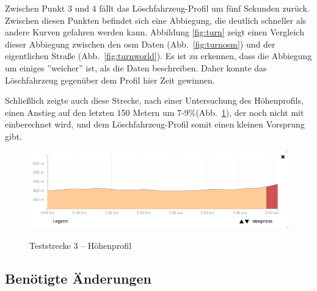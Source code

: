 Zwischen Punkt 3 und 4 fällt das Löschfahrzeug-Profil um fünf Sekunden zurück.
Zwischen diesen Punkten befindet sich eine Abbiegung, die deutlich schneller als andere Kurven gefahren werden kann.
Abbildung \ref{fig:turn} zeigt einen Vergleich dieser Abbiegung zwischen den \gls{osm} Daten (Abb.~\ref{fig:turnosm}) und der eigentlichen Straße (Abb.~\ref{fig:turnworld}).
Es ist zu erkennen, dass die Abbiegung um einiges ''weicher'' ist, als die Daten beschreiben.
Daher konnte das Löschfahrzeug gegenüber dem Profil hier Zeit gewinnen.

Schließlich zeigte auch diese Strecke, nach einer Untersuchung des Höhenprofils, einen Anstieg auf den letzten 150 Metern um 7-9$\%$(Abb.~\ref{fig:profile2}), der noch nicht mit einberechnet wird, und dem Löschfahrzeug-Profil somit einen kleinen Vorsprung gibt.

\begin{figure}[htb]
\centering
\caption{Teststrecke 3 -- Höhenprofil}
\label{fig:profile2}
\includegraphics[width = 0.90 \textwidth]{../media/Fahrt3_Profile.png} \\
\end{figure}


\subsection{Benötigte Änderungen}

